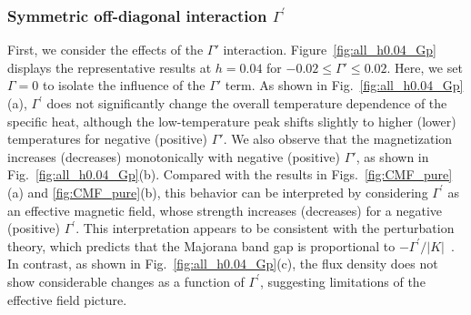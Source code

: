\documentclass[twocolumn,superscriptaddress,showpacs, longbibliography, aps, prx]{revtex4-2}
\begin{document}
\subsubsection{Symmetric off-diagonal interaction $\Gamma^{\prime}$}\label{subsec:Gamma_prime}
First, we consider the effects of the $\Gamma'$ interaction. 
Figure~\ref{fig:all_h0.04_Gp} displays the representative results at $h=0.04$ for $-0.02 \leq \Gamma' \leq 0.02$. 
Here, we set $\Gamma = 0$ to isolate the influence of the $\Gamma'$ term. 
As shown in Fig.~\ref{fig:all_h0.04_Gp}(a), $\Gamma^{\prime}$ does not significantly change 
the overall temperature dependence of the specific heat, although the low-temperature peak
shifts slightly to higher (lower) temperatures for negative (positive) $\Gamma'$. 
We also observe that the magnetization increases (decreases) monotonically with negative (positive) $\Gamma'$, as shown in Fig.~\ref{fig:all_h0.04_Gp}(b).
Compared with the results in Figs.~\ref{fig:CMF_pure}(a) and \ref{fig:CMF_pure}(b), this behavior can be interpreted by considering $\Gamma^{\prime}$ as an effective magnetic field, whose strength increases (decreases) for a negative (positive)  $\Gamma^{\prime}$. 
This interpretation appears to be consistent with the perturbation theory, which predicts that the Majorana band gap is proportional to $-\Gamma^{\prime}/|K|$~\cite{TakikawaF2020}. 
In contrast, as shown in Fig.~\ref{fig:all_h0.04_Gp}(c), the flux density does not show considerable changes as a function of $\Gamma^{\prime}$, suggesting limitations of the effective field picture.
\end{document}
